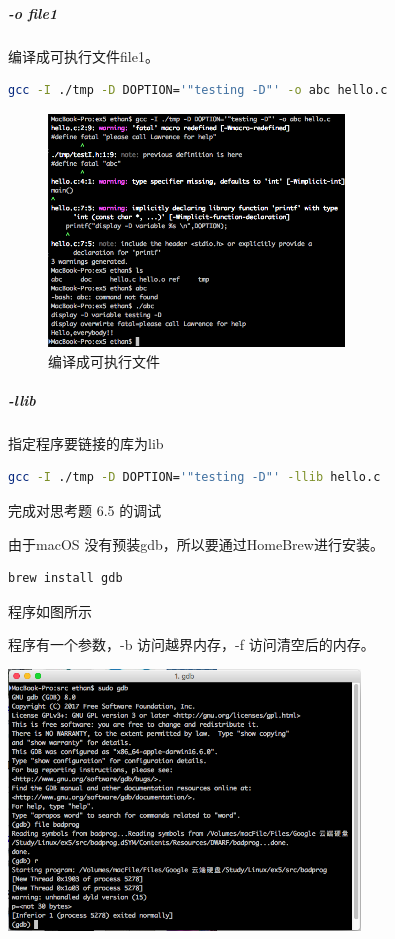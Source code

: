\documentclass{JNUexp}
\begin{document}
\begin{answer}
    \subparagraph{-o file1} 编译成可执行文件file1。
    \begin{lstlisting}[language=sh]
gcc -I ./tmp -D DOPTION='"testing -D"' -o abc hello.c
    \end{lstlisting}
    \begin{figure}[h]
        \centering
        \includegraphics[width=0.7\textwidth]{3}
        \caption{编译成可执行文件}
    \end{figure}

    \subparagraph{-llib} 指定程序要链接的库为lib
    \begin{lstlisting}[language=sh]
gcc -I ./tmp -D DOPTION='"testing -D"' -llib hello.c
    \end{lstlisting}

\end{answer}

\begin{problem}
    完成对思考题 6.5 的调试
\end{problem}

\begin{answer}
    由于macOS 没有预装gdb，所以要通过HomeBrew进行安装。
    \begin{lstlisting}[language=sh]
brew install gdb
    \end{lstlisting}

    程序如图所示
    
    
    程序有一个参数，-b 访问越界内存，-f 访问清空后的内存。\\
\end{answer}

\begin{image}
    \includegraphics[width=0.7\textwidth]{4}
\end{image}
\end{document}
